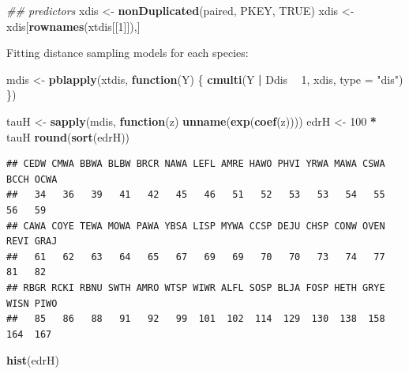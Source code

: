 \documentclass[12pt,]{book}
\newenvironment{Shaded}{\begin{snugshade}}{\end{snugshade}}
\newcommand{\CommentTok}[1]{\textcolor[rgb]{0.56,0.35,0.01}{\textit{#1}}}
\newcommand{\ControlFlowTok}[1]{\textcolor[rgb]{0.13,0.29,0.53}{\textbf{#1}}}
\newcommand{\DataTypeTok}[1]{\textcolor[rgb]{0.13,0.29,0.53}{#1}}
\newcommand{\DecValTok}[1]{\textcolor[rgb]{0.00,0.00,0.81}{#1}}
\newcommand{\KeywordTok}[1]{\textcolor[rgb]{0.13,0.29,0.53}{\textbf{#1}}}
\newcommand{\NormalTok}[1]{#1}
\newcommand{\OperatorTok}[1]{\textcolor[rgb]{0.81,0.36,0.00}{\textbf{#1}}}
\newcommand{\OtherTok}[1]{\textcolor[rgb]{0.56,0.35,0.01}{#1}}
\newcommand{\StringTok}[1]{\textcolor[rgb]{0.31,0.60,0.02}{#1}}
\begin{document}
\begin{Shaded}
\begin{Highlighting}[]
\CommentTok{## predictors}
\NormalTok{xdis <-}\StringTok{ }\KeywordTok{nonDuplicated}\NormalTok{(paired, PKEY, }\OtherTok{TRUE}\NormalTok{)}
\NormalTok{xdis <-}\StringTok{ }\NormalTok{xdis[}\KeywordTok{rownames}\NormalTok{(xtdis[[}\DecValTok{1}\NormalTok{]]),]}
\end{Highlighting}
\end{Shaded}

Fitting distance sampling models for each species:

\begin{Shaded}
\begin{Highlighting}[]
\NormalTok{mdis <-}\StringTok{ }\KeywordTok{pblapply}\NormalTok{(xtdis, }\ControlFlowTok{function}\NormalTok{(Y) \{}
  \KeywordTok{cmulti}\NormalTok{(Y }\OperatorTok{|}\StringTok{ }\NormalTok{Ddis }\OperatorTok{~}\StringTok{ }\DecValTok{1}\NormalTok{, xdis, }\DataTypeTok{type =} \StringTok{"dis"}\NormalTok{)}
\NormalTok{\})}
\end{Highlighting}
\end{Shaded}

\begin{Shaded}
\begin{Highlighting}[]
\NormalTok{tauH <-}\StringTok{ }\KeywordTok{sapply}\NormalTok{(mdis, }\ControlFlowTok{function}\NormalTok{(z) }\KeywordTok{unname}\NormalTok{(}\KeywordTok{exp}\NormalTok{(}\KeywordTok{coef}\NormalTok{(z))))}
\NormalTok{edrH <-}\StringTok{ }\DecValTok{100} \OperatorTok{*}\StringTok{ }\NormalTok{tauH}
\KeywordTok{round}\NormalTok{(}\KeywordTok{sort}\NormalTok{(edrH))}
\end{Highlighting}
\end{Shaded}

\begin{verbatim}
## CEDW CMWA BBWA BLBW BRCR NAWA LEFL AMRE HAWO PHVI YRWA MAWA CSWA BCCH OCWA 
##   34   36   39   41   42   45   46   51   52   53   53   54   55   56   59 
## CAWA COYE TEWA MOWA PAWA YBSA LISP MYWA CCSP DEJU CHSP CONW OVEN REVI GRAJ 
##   61   62   63   64   65   67   69   69   70   70   73   74   77   81   82 
## RBGR RCKI RBNU SWTH AMRO WTSP WIWR ALFL SOSP BLJA FOSP HETH GRYE WISN PIWO 
##   85   86   88   91   92   99  101  102  114  129  130  138  158  164  167
\end{verbatim}

\begin{Shaded}
\begin{Highlighting}[]
\KeywordTok{hist}\NormalTok{(edrH)}
\end{Highlighting}
\end{Shaded}
\end{document}

